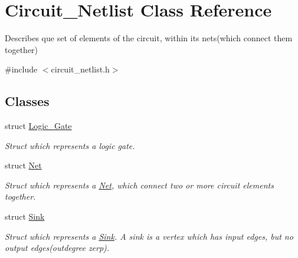 \hypertarget{classCircuit__Netlist}{\section{Circuit\-\_\-\-Netlist Class Reference}
\label{classCircuit__Netlist}
}


Describes que set of elements of the circuit, within its nets(which connect them together)  




{\ttfamily \#include $<$circuit\-\_\-netlist.\-h$>$}

\subsection*{Classes}
\begin{DoxyCompactItemize}
\item 
struct \hyperlink{structCircuit__Netlist_1_1Logic__Gate}{Logic\-\_\-\-Gate}
\begin{DoxyCompactList}\small\item\em Struct which represents a logic gate. \end{DoxyCompactList}\item 
struct \hyperlink{structCircuit__Netlist_1_1Net}{Net}
\begin{DoxyCompactList}\small\item\em Struct which represents a \hyperlink{structCircuit__Netlist_1_1Net}{Net}, which connect two or more circuit elements together. \end{DoxyCompactList}\item 
struct \hyperlink{structCircuit__Netlist_1_1Sink}{Sink}
\begin{DoxyCompactList}\small\item\em Struct which represents a \hyperlink{structCircuit__Netlist_1_1Sink}{Sink}. A sink is a vertex which has input edges, but no output edges(outdegree zerp). \end{DoxyCompactList}\end{DoxyCompactItemize}
